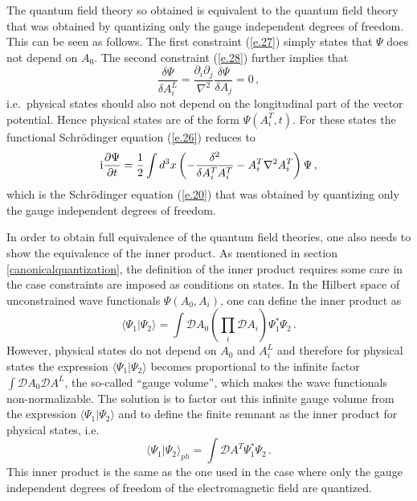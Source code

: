 \documentclass[12pt]{article}
\def\la{\langle}
\def\ra{\rangle}
\def\ii{\textrm i}
\begin{document}
The quantum field theory so obtained is equivalent to the quantum field theory that was obtained by quantizing only the gauge independent degrees of freedom. This can be seen as follows. The first constraint ({\ref{e.27}}) simply states that $\Psi$ does not depend on $A_0$. The second constraint ({\ref{e.28}}) further implies that 
\begin{equation}
\frac{\delta \Psi}{\delta A^L_i} =  \frac{\partial_i \partial_j }{\nabla^2} \frac{\delta \Psi }{\delta A_j} = 0\,,
\label{e.29}
\end{equation}
i.e.\ physical states should also not depend on the longitudinal part of the vector potential. Hence physical states are of the form $\Psi( A^T_i,t)$. For these states the functional Schr{\"o}\-ding\-er equation ({\ref{e.26}}) reduces to 
\begin{equation}
\ii\frac{\partial \Psi}{\partial t} = \frac{1}{2}  \int d^3 x \left( -\frac{\delta^2}{ \delta A^T_i A^T_i} - A^T_i \nabla^2 A^T_i  \right)\Psi \,,
\label{e.30}
\end{equation}
which is the Schr{\"o}\-ding\-er equation ({\ref{e.20}}) that was obtained by quantizing only the gauge independent degrees of freedom. 

In order to obtain full equivalence of the quantum field theories, one also needs to show the equivalence of the inner product. As mentioned in section \ref{canonicalquantization}, the definition of the inner product requires some care in the case constraints are imposed as conditions on states. In the Hilbert space of unconstrained wave functionals $\Psi(A_0,A_i)$, one can define the inner product as
\begin{equation}
\la \Psi_1 | \Psi_2 \ra = \int  {\mathcal D} A_0 \left(\prod_i {\mathcal D} A_i\right) \Psi^*_1 \Psi_2\,. 
\label{e.31}
\end{equation}
However, physical states do not depend on $A_0$ and $A^L_i$ and therefore for physical states the expression $\la \Psi_1 | \Psi_2 \ra$ becomes proportional to the infinite factor $\int {\mathcal D} A_0  {\mathcal D} A^L$, the so-called ``gauge volume'', which makes the wave functionals non-normalizable. The solution is to factor out this infinite gauge volume from the expression $\la \Psi_1 | \Psi_2 \ra$ and to define the finite remnant as the inner product for physical states, i.e.\
\begin{equation}
\la \Psi_1 | \Psi_2 \ra_{ph} = \int {\mathcal D} A^T \Psi^*_1 \Psi_2\,. 
\label{e.32}
\end{equation}
This inner product is the same as the one used in the case where only the gauge independent degrees of freedom of the electromagnetic field are quantized.
\end{document}
